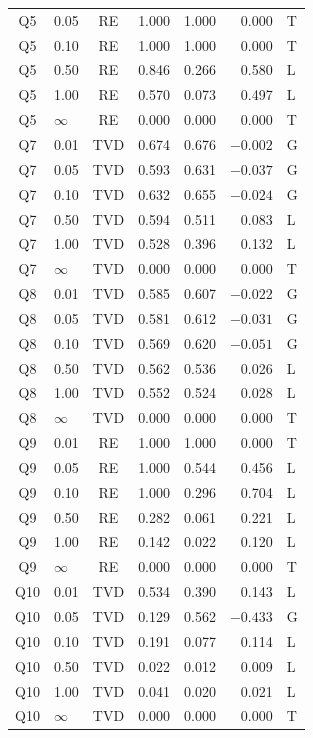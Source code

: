 \documentclass[12pt,letterpaper]{article}
\begin{document}
\begin{table}[H]
\begin{minipage}[t]{0.48\textwidth}
\begin{tabular}{@{}clcrrrl@{}}
Q5 & 0.05 & RE & 1.000 & 1.000 & 0.000 & T \\
Q5 & 0.10 & RE & 1.000 & 1.000 & 0.000 & T \\
Q5 & 0.50 & RE & 0.846 & 0.266 & 0.580 & L \\
Q5 & 1.00 & RE & 0.570 & 0.073 & 0.497 & L \\
Q5 & $\infty$ & RE & 0.000 & 0.000 & 0.000 & T \\
\midrule
Q7 & 0.01 & TVD & 0.674 & 0.676 & $-0.002$ & G \\
Q7 & 0.05 & TVD & 0.593 & 0.631 & $-0.037$ & G \\
Q7 & 0.10 & TVD & 0.632 & 0.655 & $-0.024$ & G \\
Q7 & 0.50 & TVD & 0.594 & 0.511 & 0.083 & L \\
Q7 & 1.00 & TVD & 0.528 & 0.396 & 0.132 & L \\
Q7 & $\infty$ & TVD & 0.000 & 0.000 & 0.000 & T \\
\midrule
Q8 & 0.01 & TVD & 0.585 & 0.607 & $-0.022$ & G \\
Q8 & 0.05 & TVD & 0.581 & 0.612 & $-0.031$ & G \\
Q8 & 0.10 & TVD & 0.569 & 0.620 & $-0.051$ & G \\
Q8 & 0.50 & TVD & 0.562 & 0.536 & 0.026 & L \\
Q8 & 1.00 & TVD & 0.552 & 0.524 & 0.028 & L \\
Q8 & $\infty$ & TVD & 0.000 & 0.000 & 0.000 & T \\
\midrule
Q9 & 0.01 & RE & 1.000 & 1.000 & 0.000 & T \\
Q9 & 0.05 & RE & 1.000 & 0.544 & 0.456 & L \\
Q9 & 0.10 & RE & 1.000 & 0.296 & 0.704 & L \\
Q9 & 0.50 & RE & 0.282 & 0.061 & 0.221 & L \\
Q9 & 1.00 & RE & 0.142 & 0.022 & 0.120 & L \\
Q9 & $\infty$ & RE & 0.000 & 0.000 & 0.000 & T \\
\midrule
Q10 & 0.01 & TVD & 0.534 & 0.390 & 0.143 & L \\
Q10 & 0.05 & TVD & 0.129 & 0.562 & $-0.433$ & G \\
Q10 & 0.10 & TVD & 0.191 & 0.077 & 0.114 & L \\
Q10 & 0.50 & TVD & 0.022 & 0.012 & 0.009 & L \\
Q10 & 1.00 & TVD & 0.041 & 0.020 & 0.021 & L \\
Q10 & $\infty$ & TVD & 0.000 & 0.000 & 0.000 & T \\
\bottomrule

\end{tabular}
\end{minipage}
\end{table}
\end{document}
